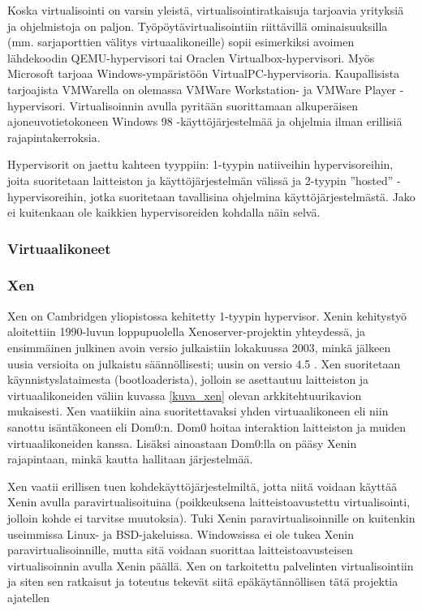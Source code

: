 
Koska virtualisointi on varsin yleistä, virtualisointiratkaisuja tarjoavia yrityksiä ja ohjelmistoja on paljon. Työpöytävirtualisointiin riittävillä ominaisuuksilla (mm. sarjaporttien välitys virtuaalikoneille) sopii esimerkiksi avoimen lähdekoodin QEMU-hypervisori tai Oraclen Virtualbox-hypervisori. Myös Microsoft tarjoaa Windows-ympäristöön VirtualPC-hypervisoria. Kaupallisista tarjoajista VMWarella on olemassa VMWare Workstation- ja VMWare Player -hypervisori. Virtualisoinnin avulla pyritään suorittamaan alkuperäisen ajoneuvotietokoneen Windows 98 -käyttöjärjestelmää ja ohjelmia ilman erillisiä rajapintakerroksia.

Hypervisorit on jaettu kahteen tyyppiin: 1-tyypin natiiveihin hypervisoreihin, joita suoritetaan laitteiston ja käyttöjärjestelmän välissä ja 2-tyypin ''hosted'' -hypervisoreihin, jotka suoritetaan tavallisina ohjelmina käyttöjärjestelmästä. Jako ei kuitenkaan ole kaikkien hypervisoreiden kohdalla näin selvä. %


\subsubsection{Virtuaalikoneet}
\subsubsection{Xen}
Xen on Cambridgen yliopistossa kehitetty 1-tyypin hypervisor. %
Xenin kehitystyö aloitettiin 1990-luvun loppupuolella Xenoserver-projektin yhteydessä, ja ensimmäinen julkinen avoin versio julkaistiin lokakuussa 2003, minkä jälkeen uusia versioita on julkaistu säännöllisesti; uusin on versio 4.5 \cite{xen_history}. Xen suoritetaan käynnistyslataimesta (bootloaderista), jolloin se asettautuu laitteiston ja virtuaalikoneiden väliin kuvassa \ref{kuva_xen} olevan arkkitehtuurikavion mukaisesti. Xen vaatiikiin aina suoritettavaksi yhden virtuaalikoneen eli niin sanottu isäntäkoneen eli Dom0:n. Dom0 hoitaa interaktion laitteiston ja muiden virtuaalikoneiden kanssa. Lisäksi ainoastaan Dom0:lla on pääsy Xenin rajapintaan, minkä kautta hallitaan järjestelmää.

Xen vaatii erillisen tuen kohdekäyttöjärjestelmiltä, jotta niitä voidaan käyttää Xenin avulla paravirtualisoituina (poikkeuksena laitteistoavustettu virtualisointi, jolloin kohde ei tarvitse muutoksia). Tuki Xenin paravirtualisoinnille on kuitenkin useimmissa Linux- ja BSD-jakeluissa. Windowsissa ei ole tukea Xenin paravirtualisoinnille, mutta sitä voidaan suorittaa laitteistoavusteisen virtualisoinnin avulla Xenin päällä. Xen on tarkoitettu palvelinten virtualisointiin ja siten sen ratkaisut ja toteutus tekevät siitä epäkäytännöllisen tätä projektia ajatellen \citep{xen_overview}

